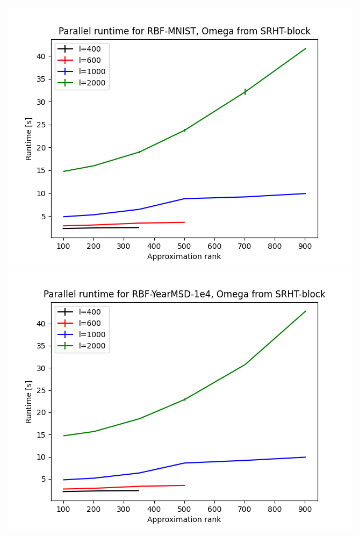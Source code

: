 \documentclass{article}
\theoremstyle{definition}
\begin{document}

\begin{figure}
\centering
\hfill\begin{subfigure}[t]{\textwidth+20pt\relax}
    \includegraphics[width=\dimexpr\linewidth-20pt\relax]
        {../plots/runtime_new/runtime_par_RBF-MNIST_SRHT-block.png}
    \includegraphics[width=\dimexpr\linewidth-20pt\relax]
        {../plots/runtime_new/runtime_par_RBF-YearMSD-1e4_SRHT-block.png}

\end{subfigure}
\end{figure}
\end{document}
